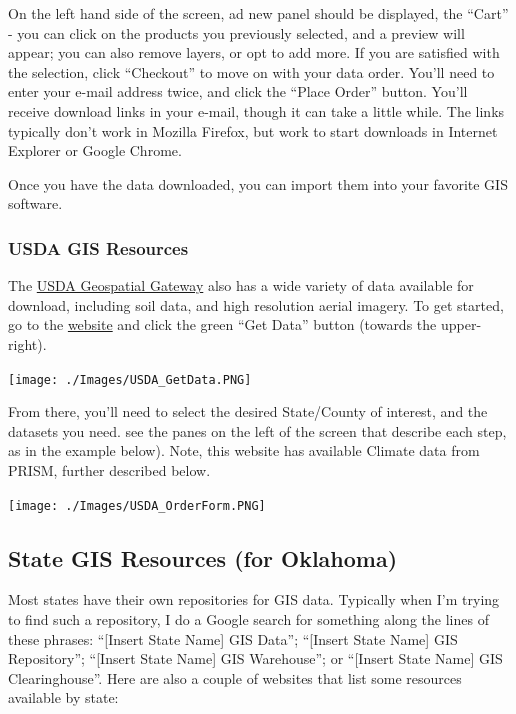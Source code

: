 \documentclass[12pt,]{article}
\begin{document}
On the left hand side of the screen, ad new panel should be displayed,
the ``Cart'' - you can click on the products you previously selected,
and a preview will appear; you can also remove layers, or opt to add
more. If you are satisfied with the selection, click ``Checkout'' to
move on with your data order. You'll need to enter your e-mail address
twice, and click the ``Place Order'' button. You'll receive download
links in your e-mail, though it can take a little while. The links
typically don't work in Mozilla Firefox, but work to start downloads in
Internet Explorer or Google Chrome.

Once you have the data downloaded, you can import them into your
favorite GIS software.

\subsubsection{USDA GIS Resources}\label{usda-gis-resources}

The \href{http://datagateway.nrcs.usda.gov/}{USDA Geospatial Gateway}
also has a wide variety of data available for download, including soil
data, and high resolution aerial imagery. To get started, go to the
\href{http://datagateway.nrcs.usda.gov/}{website} and click the green
``Get Data'' button (towards the upper-right).

\texttt{[image: ./Images/USDA\_GetData.PNG]}~

From there, you'll need to select the desired State/County of interest,
and the datasets you need. see the panes on the left of the screen that
describe each step, as in the example below). Note, this website has
available Climate data from PRISM, further described below.

\texttt{[image: ./Images/USDA\_OrderForm.PNG]}\\

\subsection{State GIS Resources (for
Oklahoma)}\label{state-gis-resources-for-oklahoma}

Most states have their own repositories for GIS data. Typically when I'm
trying to find such a repository, I do a Google search for something
along the lines of these phrases: ``{[}Insert State Name{]} GIS Data'';
``{[}Insert State Name{]} GIS Repository''; ``{[}Insert State Name{]}
GIS Warehouse''; or ``{[}Insert State Name{]} GIS Clearinghouse''. Here
are also a couple of websites that list some resources available by
state:
\end{document}
